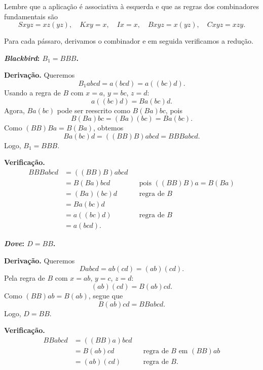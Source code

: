 \begin{solution}
Lembre que a aplicação é associativa à esquerda e que as regras dos combinadores fundamentais são
\[
Sxyz = xz(yz),\quad Kxy = x,\quad Ix = x,\quad Bxyz = x(yz),\quad Cxyz = xzy.
\]

Para cada pássaro, derivamos o combinador e em seguida verificamos a redução.

\begin{Qlist}
\item[(a)] \textbf{\textit{Blackbird}: $B_1 = BBB$.}

\textbf{Derivação.} Queremos
\[
B_1 a b c d = a(b c d) = a((bc)d).
\]
Usando a regra de \(B\) com \(x=a\), \(y=bc\), \(z=d\):
\[
a((bc)d) = B a (bc) d.
\]
Agora, \(B a (bc)\) pode ser reescrito como \(B(Ba)bc\), pois
\[
B(Ba)bc = (Ba)(bc) = Ba(bc).
\]
Como \((BB)Ba = B(Ba)\), obtemos
\[
B a (bc) d = ((BB)B) a b c d = BBBabcd.
\]
Logo, \(B_1 = BBB\).

\textbf{Verificação.}
\[
\begin{aligned}
BBBabcd
&= ((BB)B) a b c d \\
&= B(Ba)bcd && \text{pois } ((BB)B)a = B(Ba) \\
&= (Ba)(bc)d && \text{regra de } B \\
&= Ba(bc)d \\
&= a((bc)d) && \text{regra de } B \\
&= a(bcd).
\end{aligned}
\]

\item[(b)] \textbf{\textit{Dove}: $D = BB$.}

\textbf{Derivação.} Queremos
\[
Dabcd = ab(cd) = (ab)(cd).
\]
Pela regra de \(B\) com \(x=ab\), \(y=c\), \(z=d\):
\[
(ab)(cd) = B(ab)cd.
\]
Como \((BB)ab = B(ab)\), segue que
\[
B(ab)cd = BBabcd.
\]
Logo, \(D = BB\).

\textbf{Verificação.}
\[
\begin{aligned}
BBabcd
&= ((BB)a)bcd \\
&= B(ab)cd && \text{regra de } B \text{ em } (BB)ab\\
&= (ab)(cd) && \text{regra de } B.
\end{aligned}
\]


\end{Qlist}
\end{solution}
